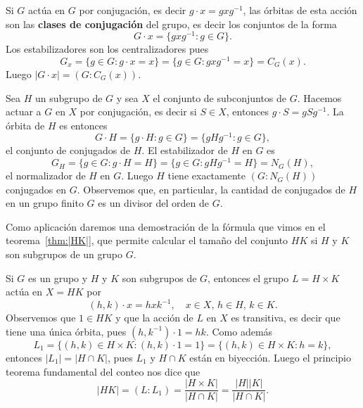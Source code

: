 

\begin{example}
	Si $G$ actúa en $G$ por conjugación, es decir $g\cdot x=gxg^{-1}$, las órbitas de esta acción son las \textbf{clases de conjugación} del grupo, es decir los conjuntos de la forma
	\[
	G\cdot x=\{gxg^{-1}:g\in G\}.
	\]
	Los estabilizadores son los centralizadores pues
	\[
	G_x=\{g\in G:g\cdot x=x\}=\{g\in G:gxg^{-1}=x\}=C_G(x).
	\]
	Luego $|G\cdot x|=(G:C_G(x))$. 
\end{example}

\begin{example}
	Sea $H$ un subgrupo de $G$ y sea $X$ el conjunto de subconjuntos de $G$. Hacemos actuar a $G$ en $X$ por conjugación, es decir si $S\in X$, entonces 
	$g\cdot S=gSg^{-1}$. La órbita de $H$ es entonces
	\[
	G\cdot H=\{g\cdot H:g\in G\}=\{gHg^{-1}:g\in G\},
	\]
	el conjunto de conjugados de $H$. El estabilizador de $H$ en $G$ es 
	\[
	G_H=\{g\in G:g\cdot H=H\}=\{g\in G:gHg^{-1}=H\}=N_G(H),
	\]
	el normalizador de $H$ en $G$. Luego $H$ tiene exactamente $(G:N_G(H))$ conjugados en $G$. Observemos que, en particular, la cantidad de conjugados de $H$ en un grupo finito $G$ es un divisor del orden de $G$. 
\end{example}

Como aplicación daremos una demostración de la fórmula que vimos en el teorema~\ref{thm:|HK|}, 
que permite calcular el tamaño del conjunto $HK$ si $H$ y $K$ 
son subgrupos de un grupo $G$. 

\begin{example}
Si $G$ es un grupo y $H$ y $K$ son subgrupos de $G$, entonces 
el grupo $L=H\times K$ actúa en $X=HK$ por
\[
(h,k)\cdot x=hxk^{-1},\quad x\in X,\,h\in H,\,k\in K.
\] 
Observemos que $1\in HK$ y que la acción de $L$ en $X$ es transitiva, 
es decir que tiene una única órbita, pues
$(h,k^{-1})\cdot 1 = hk$. Como además    
\[
L_1=\{(h,k)\in H\times K: (h,k)\cdot 1=1\}=\{(h,k)\in H\times K:h=k\},
\]
entonces $|L_1|=|H\cap K|$, pues $L_1$ y $H\cap K$ están en biyección. Luego 
el principio teorema fundamental del conteo 
nos dice que  
\[
|HK|=(L:L_1)=\frac{|H\times K|}{|H\cap K|}=\frac{|H||K|}{|H\cap K|}.
\]
\end{example}

